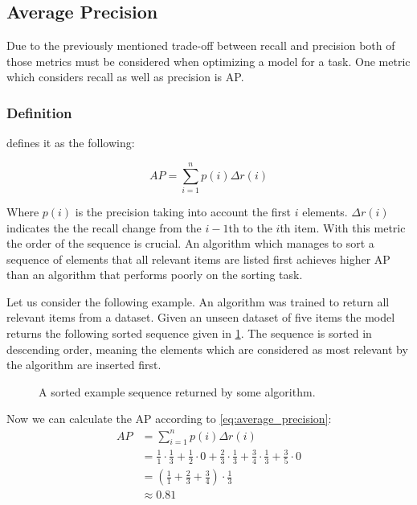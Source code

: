 \subsection{Average Precision}
\label{chp:fundamentals:sec:metrics:subsec:average_precision}

Due to the previously mentioned trade-off between recall and precision both of those metrics must be considered when optimizing a model for a task.
One metric which considers recall as well as precision is \ac{AP}.

\subsubsection{Definition}
\label{chp:fundamentals:sec:metrics:subsec:average_precision:definition}

\Textcite{Zhu:2004} defines it as the following:

\begin{equation}\label{eq:average_precision}
    AP = \sum_{i=1}^n {p(i)\Delta r(i)}
\end{equation}

Where $p(i)$ is the precision taking into account the first $i$ elements.
$\Delta r(i)$ indicates the the recall change from the $i-1$th to the $i$th item.
With this metric the order of the sequence is crucial.
An algorithm which manages to sort a sequence of elements that all relevant items are listed first achieves higher AP than an algorithm that performs poorly on the sorting task.

Let us consider the following example.
An algorithm was trained to return all relevant items from a dataset.
Given an unseen dataset of five items the model returns the following sorted sequence given in \cref{fig:metrics:average_precision:sample}.
The sequence is sorted in descending order, meaning the elements which are considered as most relevant by the algorithm are inserted first.

\begin{figure}[htpb]
    \centering
    \def\svgwidth{\columnwidth}
    
    \caption[Example Sequence]{A sorted example sequence returned by some algorithm.}\label{fig:metrics:average_precision:sample}
\end{figure}

Now we can calculate the \ac{AP} according to \cref{eq:average_precision}:
\begin{equation}
    \begin{aligned}
        AP &= \sum_{i=1}^n {p(i)\Delta r(i)}\\
        &= \frac{1}{1} \cdot \frac{1}{3} + \frac{1}{2} \cdot 0 + \frac{2}{3} \cdot \frac{1}{3} + \frac{3}{4} \cdot \frac{1}{3} + \frac{3}{5} \cdot 0\\
        &=  (\frac{1}{1} + \frac{2}{3}  + \frac{3}{4}) \cdot \frac{1}{3}\\
        &\approx 0.81
    \end{aligned}
\end{equation}

